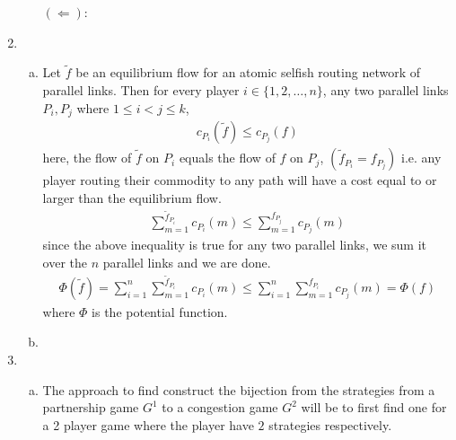 \documentclass[a4paper,12pt]{article}
\theoremstyle{definition}
\begin{document}
\begin{enumerate}
\begin{enumerate}[(i)]
$(\Leftarrow)$:
\end{enumerate}

\item
\begin{enumerate}[(a)]
\item Let $\tilde{f}$ be an equilibrium flow for an atomic selfish routing network of parallel links. Then for every player $i \in \{1,2,\ldots, n\}$, any two parallel links $P_i,P_j$ where $1\leq i < j \leq k$,
\begin{align*}
c_{P_i}(\tilde{f})\leq c_{P_j}(f)
\end{align*}
here, the flow of $\tilde{f}$ on $P_i$ equals the flow of $f$ on $P_j$, $(\tilde{f}_{P_i}=f_{P_j})$ i.e. any player routing their commodity to any path will have a cost equal to or larger than the equilibrium flow.
\begin{align*}
\sum_{m=1}^{\tilde{f}_{P_i}}c_{P_i}(m)\leq \sum_{m=1}^{f_{P_j}}c_{P_j}(m)
\end{align*}
since the above inequality is true for any two parallel links, we sum it over the $n$ parallel links and we are done.
\begin{align*}
\Phi(\tilde{f})=\sum_{i=1}^{n}\sum_{m=1}^{\tilde{f}_{P_i}}c_{P_i}(m)\leq \sum_{i=1}^{n}\sum_{m=1}^{f_{P_i}}c_{P_j}(m)=\Phi(f)
\end{align*}
where $\Phi$ is the potential function.
\item
\end{enumerate}

\item
\begin{enumerate}[(a)]
\item The approach to find construct the bijection from the strategies from a partnership game $G^1$ to a congestion game $G^2$ will be to first find one for a 2 player game where the player have $2$ strategies respectively. 
\begin{figure}[h]
\begin{floatrow}
\end{floatrow}
\end{figure}
\end{enumerate}
\end{enumerate}
\end{document}
